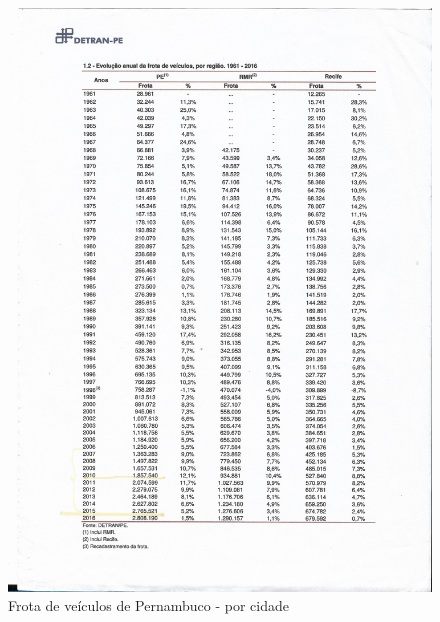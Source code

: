 \begin{figure}[ht!]
	\centering
	\caption{Frota de veículos de Pernambuco - por cidade}
	\includegraphics[scale=0.35]{Figuras/Anexos/A1-FrotaPE.pdf}
\end{figure}
	

%		

		

